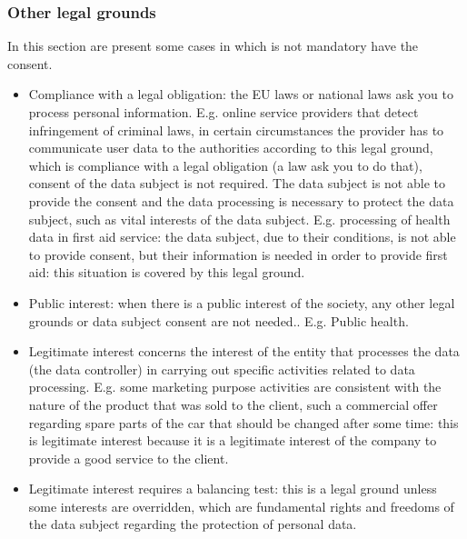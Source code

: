 \subsubsection{Other legal grounds}
In this section are present some cases in which is not mandatory have the consent.
\begin{itemize}
    \item Compliance with a legal obligation: the EU laws or national laws ask you to process personal information. E.g. online service providers that detect infringement of criminal laws, in certain circumstances the provider has to communicate user data to the authorities according to this legal ground, which is compliance with a legal obligation (a law ask you to do that), consent of the data subject is not required. The data subject is not able to provide the consent and the data processing is necessary to protect the data subject, such as vital interests of the data subject. E.g. processing of health data in first aid service: the data subject, due to their conditions, is not able to provide consent, but their information is needed in order to provide first aid: this situation is covered by this legal ground.
    \item Public interest: when there is a public interest of the society, any other legal grounds or data subject consent are not needed.. E.g. Public health.
    \item Legitimate interest concerns the interest of the entity that processes the data (the data controller) in carrying out specific activities related to data processing.  E.g. some marketing purpose activities are consistent with the nature of the product that was sold to the client, such a commercial offer regarding spare parts of the car that should be changed after some time: this is legitimate interest because it is a legitimate interest of the company to provide a good service to the client.
    \item Legitimate interest requires a balancing test: this is a legal ground unless some interests are overridden, which are fundamental rights and freedoms of the data subject regarding the protection of personal data.
\end{itemize}


